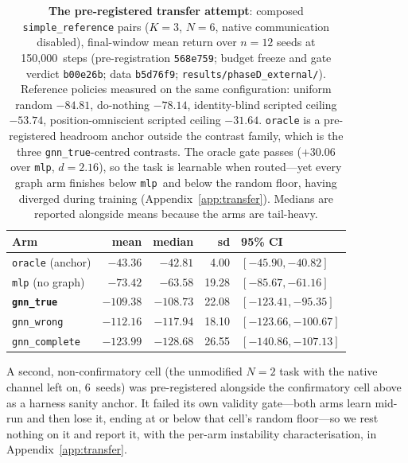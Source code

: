 \documentclass[10pt]{article}
\newcommand{\gtrue}{\texttt{gnn\_true}}
\newcommand{\mlpc}{\texttt{mlp}}
\newcommand{\PDseeds}{12}
\newcommand{\PDsteps}{150{,}000}
\newcommand{\PDfloor}{-84.81}          %
\newcommand{\PDnoop}{-78.14}           %
\newcommand{\PDblind}{-53.74}          %
\newcommand{\PDinformed}{-31.64}       %
\newcommand{\PDoracle}{-43.36}         %
\newcommand{\PDoracleMed}{-42.81}
\newcommand{\PDoracleSD}{4.00}
\newcommand{\PDoracleCI}{[-45.90, -40.82]}
\newcommand{\PDmlp}{-73.42}            %
\newcommand{\PDmlpMed}{-63.58}
\newcommand{\PDmlpSD}{19.28}
\newcommand{\PDmlpCI}{[-85.67, -61.16]}
\newcommand{\PDtrue}{-109.38}          %
\newcommand{\PDtrueMed}{-108.73}
\newcommand{\PDtrueSD}{22.08}
\newcommand{\PDtrueCI}{[-123.41, -95.35]}
\newcommand{\PDwrong}{-112.16}         %
\newcommand{\PDwrongMed}{-117.94}
\newcommand{\PDwrongSD}{18.10}
\newcommand{\PDwrongCI}{[-123.66, -100.67]}
\newcommand{\PDcomplete}{-123.99}      %
\newcommand{\PDcompleteMed}{-128.68}
\newcommand{\PDcompleteSD}{26.55}
\newcommand{\PDcompleteCI}{[-140.86, -107.13]}
\newcommand{\PDoracleGap}{+30.06}      %
\newcommand{\PDoracleD}{2.16}
\newcommand{\PDzeroSeeds}{6}
\begin{document}
\begin{table}[t]
  \centering
  \footnotesize
  \caption{\textbf{The pre-registered transfer attempt}: composed
  \texttt{simple\_reference} pairs ($K{=}3$, $N{=}6$, native communication
  disabled), final-window mean return over $n{=}\PDseeds$ seeds at
  \PDsteps\ steps (pre-registration \texttt{568e759}; budget freeze and gate verdict
  \texttt{b00e26b}; data \texttt{b5d76f9}; \texttt{results/phaseD\_external/}).
  Reference policies measured on the same configuration: uniform random
  $\PDfloor$, do-nothing $\PDnoop$, identity-blind scripted ceiling $\PDblind$,
  position-omniscient scripted ceiling $\PDinformed$. \texttt{oracle} is a
  pre-registered headroom anchor outside the contrast family, which is the
  three \gtrue-centred contrasts. The oracle gate passes ($\PDoracleGap$ over
  \mlpc, $d{=}\PDoracleD$), so the task is learnable when routed---yet every
  graph arm finishes below \mlpc\ and below the random floor, having diverged
  during training (Appendix~\ref{app:transfer}). Medians are reported alongside
  means because the arms are tail-heavy.}
  \label{tab:transfer}
  \setlength{\tabcolsep}{5pt}%
  \begin{tabular}{lrrrl}
    \toprule
    Arm & mean & median & sd & 95\% CI \\
    \midrule
    \texttt{oracle} (anchor)         & $\PDoracle$   & $\PDoracleMed$   & \PDoracleSD   & $\PDoracleCI$ \\
    \texttt{mlp} (no graph)          & $\PDmlp$      & $\PDmlpMed$      & \PDmlpSD      & $\PDmlpCI$ \\
    \textbf{\texttt{gnn\_true}}      & $\PDtrue$     & $\PDtrueMed$     & \PDtrueSD     & $\PDtrueCI$ \\
    \texttt{gnn\_wrong}              & $\PDwrong$    & $\PDwrongMed$    & \PDwrongSD    & $\PDwrongCI$ \\
    \texttt{gnn\_complete}           & $\PDcomplete$ & $\PDcompleteMed$ & \PDcompleteSD & $\PDcompleteCI$ \\
    \bottomrule
  \end{tabular}
\end{table}

A second, non-confirmatory cell (the unmodified $N{=}2$ task with the native
channel left on, \PDzeroSeeds\ seeds) was pre-registered alongside the
confirmatory cell above as a harness sanity anchor. It failed its own validity gate---both arms learn
mid-run and then lose it, ending at or below that cell's random floor---so we
rest nothing on it and report it, with the per-arm instability
characterisation, in Appendix~\ref{app:transfer}.
\end{document}
